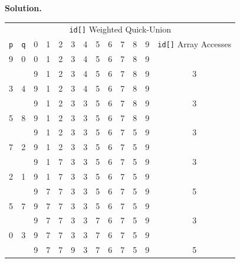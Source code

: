 \documentclass[12pt, a4paper]{article}
\newenvironment{sol}[1][Solution]
{\par\medskip\noindent \textbf{#1.} }
{\medskip}
\begin{document}
	\begin{sol}
		\begin{center}
			\begin{tabular}{cc|cccccccccc|c}
				\multicolumn{13}{c}{\texttt{id[]} Weighted Quick-Union}\\
				\texttt{p} & \texttt{q} & 0 & 1 & 2 & 3 & 4 & 5 & 6 & 7 & 8 & 9 & \texttt{id[]} Array Accesses\\
				\hline
				9  & 0  & {\color{green} 0} & 1 & 2 & 3 & 4 & 5 & 6 & 7 & 8 & {\color{green} 9} & {}\\
				{} & {} & {\color{red} 9} & 1 & 2 & 3 & 4 & 5 & 6 & 7 & 8 & 9 & 3\\
				
				3  & 4  & 9 & 1 & 2 & {\color{green} 3} & {\color{green} 4} & 5 & 6 & 7 & 8 & 9 & {}\\
				{} & {} & 9 & 1 & 2 & 3 & {\color{red} 3} & 5 & 6 & 7 & 8 & 9 & 3\\
				
				5  & 8  & 9 & 1 & 2 & 3 & 3 & {\color{green} 5} & 6 & 7 & {\color{green} 8} & 9 & {}\\
				{} & {} & 9 & 1 & 2 & 3 & 3 & 5 & 6 & 7 & {\color{red} 5} & 9 & 3\\
				
				7  & 2 & 9 & 1 & {\color{green} 2} & 3 & 3 & 5 & 6 & {\color{green} 7} & {\color{red} 5} & 9 & {}\\
				{} & {} & 9 & 1 & {\color{red} 7} & 3 & 3 & 5 & 6 & 7 & {\color{red} 5} & 9 & 3\\
				
				2  & 1 & 9 & {\color{green}1} & {\color{green} 7} & 3 & 3 & 5 & 6 & {\color{green} 7} & 5 & 9 & {}\\
				{} & {} & 9 & {\color{red}7} & 7 & 3 & 3 & 5 & 6 & 7 & 5 & 9 & 5\\
				
				5  & 7 & 9 & {\color{green} 7} & {\color{green} 7} & 3 & 3 & {\color{green} 5} & 6 & {\color{green} 7} & {\color{green}5} & 9 & {}\\
				{} & {} & 9 & 7 & 7 & 3 & 3 & {\color{red} 7} & 6 & {\color{green} 7} & 5 & 9 & 3\\
				
				0  & 3  & {\color{green} 9} & 7 & 7 & {\color{green}3} & {\color{green}3} & 7 & 6 & 7 & 5 & {\color{green}9} & {}\\
				{} & {} & 9 & 7 & 7 & {\color{red}9} & 3 & 7 & 6 & 7 & 5 & 9 & 5\\
				

\end{tabular}
\end{center}
\end{sol}
\end{document}
